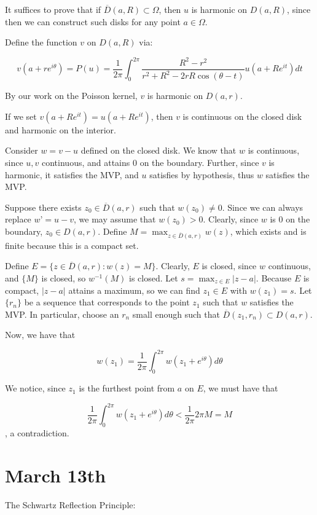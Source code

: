 \documentclass[10pt]{article}
\begin{document}
It suffices to prove that if $\overline{D}(a,R) \subset \Omega$, then $u$ is harmonic on $D(a,R)$, since then we can construct such disks for any point $a \in \Omega$.

Define the function $v$ on $D(a,R)$ via:

$$v(a + re^{i\theta}) = P(u) = \frac{1}{2\pi} \int_0^{2\pi}  \frac{R^2 - r^2}{r^2 + R^2 - 2rR \cos(\theta - t)} u(a + Re^{it}) dt $$

By our work on the Poisson kernel, $v$ is harmonic on $D(a,r)$. 

If we set $v(a + Re^{it}) = u(a + Re^{it})$, then $v$ is continuous on the closed disk and harmonic on the interior.

Consider $w = v - u$ defined on the closed disk. We know that $w$ is continuous, since $u,v$ continuous, and attains $0$ on the boundary. Further, since $v$ is harmonic, it satisfies the MVP, and $u$ satisfies by hypothesis, thus $w$ satisfies the MVP. 

Suppose there exists $z_0 \in \overline{D}(a,r)$ such that $w(z_0) \not = 0$. Since we can always replace $w’ = u - v$, we may assume that $w(z_0) > 0$. Clearly, since $w$ is 0 on the boundary, $z_0 \in D(a,r)$. Define $M = \max_{z \in \overline{D}(a,r)} w(z)$, which exists and is finite because this is a compact set.

Define $E = \{ z \in   \overline{D}(a,r) : w(z) = M \}$. Clearly, $E$ is closed, since $w$ continuous, and $\{ M \}$ is closed, so $w^{-1}(M)$ is closed. Let $s = \max_{z \in E} |z - a| $. Because $E$ is compact, $|z-a|$ attains a maximum, so we can find $z_1 \in E$ with $w(z_1) = s$. Let $\{ r_n \}$ be a sequence that corresponds to the point $z_1$ such that $w$ satisfies the MVP. In particular, choose an $r_n$ small enough such that $\overline{D}(z_1, r_n) \subset D(a,r)$.

Now, we have that 

$$w(z_1) = \frac{1}{2\pi} \int_0^{2\pi} w(z_1 + e^{i\theta}) d\theta $$

We notice, since $z_1$ is the furthest point from $a$ on $E$, we must have that

$$  \frac{1}{2\pi} \int_0^{2\pi} w(z_1 + e^{i\theta}) d\theta  <  \frac{1}{2\pi} 2\pi M = M $$, a contradiction.

\section*{March 13th}

The Schwartz Reflection Principle:
\end{document}
